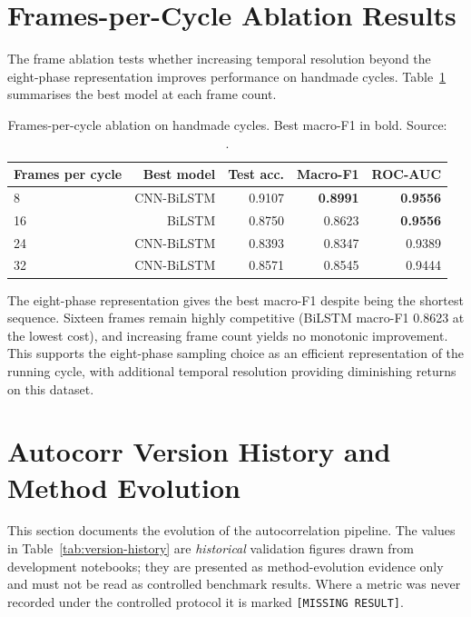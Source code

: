 \section{Frames-per-Cycle Ablation Results}
\label{sec:frames-ablation}

The frame ablation tests whether increasing temporal resolution beyond the
eight-phase representation improves performance on handmade cycles. Table~\ref{tab:frames} summarises the best model at each frame count.

\begin{table}[htbp]
\centering
\caption[Frames-per-cycle ablation on handmade cycles. Source: \protect{}.]{Frames-per-cycle ablation on handmade cycles. Best macro-F1 in bold. Source: .}
\label{tab:frames}
\small
\begin{tabular}{lrrrr}
\toprule
Frames per cycle & Best model & Test acc. & Macro-F1 & ROC-AUC \\
\midrule
8 & CNN-BiLSTM & 0.9107 & \textbf{0.8991} & \textbf{0.9556} \\
16 & BiLSTM & 0.8750 & 0.8623 & \textbf{0.9556} \\
24 & CNN-BiLSTM & 0.8393 & 0.8347 & 0.9389 \\
32 & CNN-BiLSTM & 0.8571 & 0.8545 & 0.9444 \\
\bottomrule
\end{tabular}
\end{table}

The eight-phase representation gives the best macro-F1 despite being the
shortest sequence. Sixteen frames remain highly competitive
(BiLSTM macro-F1 0.8623 at the lowest cost), and increasing frame count
yields no monotonic improvement. This supports the eight-phase sampling
choice as an efficient representation of the running cycle, with additional
temporal resolution providing diminishing returns on this dataset.

\section{Autocorr Version History and Method Evolution}
\label{sec:version-history}

This section documents the evolution of the autocorrelation pipeline. The
values in Table~\ref{tab:version-history} are \emph{historical} validation
figures drawn from development notebooks; they are presented as method-evolution
evidence only and must not be read as controlled benchmark results. Where a
metric was never recorded under the controlled protocol it is marked
\texttt{[MISSING RESULT]}.

